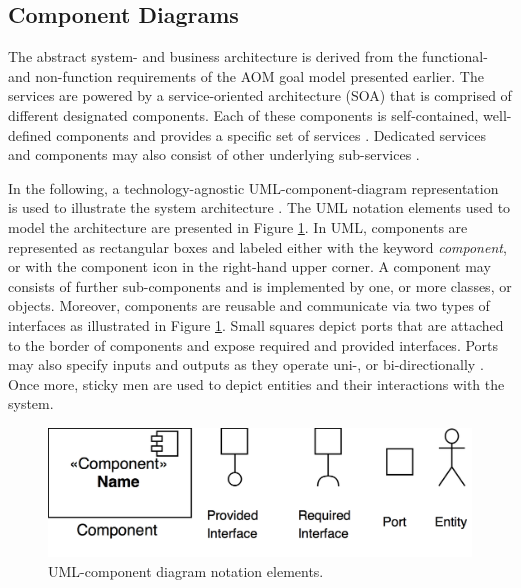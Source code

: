 \documentclass{llncs}
\begin{document}
{		\subsection{Component Diagrams}
			\label{ss:component-diagrams}

			The abstract system- and business architecture is derived from the functional- and non-function requirements of the AOM goal model presented earlier. The services are powered by a service-oriented architecture (SOA) that is comprised of different designated components. Each of these components is self-contained, well-defined components and provides a specific set of services \cite{erl2005service}\cite{perrey2003service}. Dedicated services and components may also consist of other underlying sub-services \cite{rosen2012applied}. 
			
			In the following, a technology-agnostic UML-component-diagram representation is used to illustrate the system architecture \cite{booch1996unified}\cite{specification2007omg}. The UML notation elements used to model the architecture are presented in Figure \ref{fig:uml-component-diagram-overview}. In UML, components are represented as rectangular boxes and labeled either with the keyword \textit{component}, or with the component icon in the right-hand upper corner. A component may consists of further sub-components and is implemented by one, or more classes, or objects. Moreover, components are reusable and communicate via two types of interfaces as illustrated in Figure \ref{fig:uml-component-diagram-overview}. Small squares depict ports that are attached to the border of components and expose required and provided interfaces. Ports may also specify inputs and outputs as they operate uni-, or bi-directionally \cite{booch1996unified}\cite{specification2007omg}. Once more, sticky men are used to depict entities and their interactions with the system. 
			
			\begin{figure}[H]
				\centering
				\includegraphics[scale=0.15]{Figures/UML-notation-elements.png}
				\caption{UML-component diagram notation elements.}	
				\label{fig:uml-component-diagram-overview}
			\end{figure}	
			
}
\end{document}
